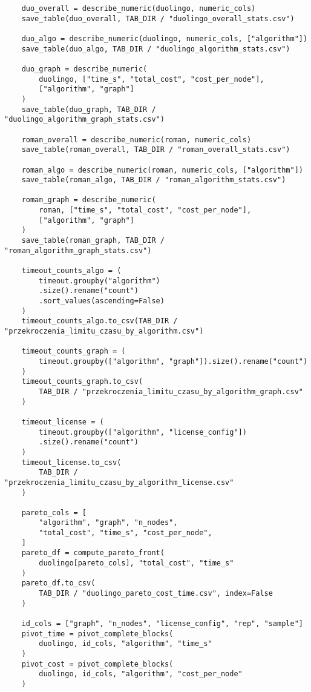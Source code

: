 \begin{verbatim}
    duo_overall = describe_numeric(duolingo, numeric_cols)
    save_table(duo_overall, TAB_DIR / "duolingo_overall_stats.csv")

    duo_algo = describe_numeric(duolingo, numeric_cols, ["algorithm"])
    save_table(duo_algo, TAB_DIR / "duolingo_algorithm_stats.csv")

    duo_graph = describe_numeric(
        duolingo, ["time_s", "total_cost", "cost_per_node"],
        ["algorithm", "graph"]
    )
    save_table(duo_graph, TAB_DIR / "duolingo_algorithm_graph_stats.csv")

    roman_overall = describe_numeric(roman, numeric_cols)
    save_table(roman_overall, TAB_DIR / "roman_overall_stats.csv")

    roman_algo = describe_numeric(roman, numeric_cols, ["algorithm"])
    save_table(roman_algo, TAB_DIR / "roman_algorithm_stats.csv")

    roman_graph = describe_numeric(
        roman, ["time_s", "total_cost", "cost_per_node"],
        ["algorithm", "graph"]
    )
    save_table(roman_graph, TAB_DIR / "roman_algorithm_graph_stats.csv")

    timeout_counts_algo = (
        timeout.groupby("algorithm")
        .size().rename("count")
        .sort_values(ascending=False)
    )
    timeout_counts_algo.to_csv(TAB_DIR / "przekroczenia_limitu_czasu_by_algorithm.csv")

    timeout_counts_graph = (
        timeout.groupby(["algorithm", "graph"]).size().rename("count")
    )
    timeout_counts_graph.to_csv(
        TAB_DIR / "przekroczenia_limitu_czasu_by_algorithm_graph.csv"
    )

    timeout_license = (
        timeout.groupby(["algorithm", "license_config"])
        .size().rename("count")
    )
    timeout_license.to_csv(
        TAB_DIR / "przekroczenia_limitu_czasu_by_algorithm_license.csv"
    )

    pareto_cols = [
        "algorithm", "graph", "n_nodes",
        "total_cost", "time_s", "cost_per_node",
    ]
    pareto_df = compute_pareto_front(
        duolingo[pareto_cols], "total_cost", "time_s"
    )
    pareto_df.to_csv(
        TAB_DIR / "duolingo_pareto_cost_time.csv", index=False
    )

    id_cols = ["graph", "n_nodes", "license_config", "rep", "sample"]
    pivot_time = pivot_complete_blocks(
        duolingo, id_cols, "algorithm", "time_s"
    )
    pivot_cost = pivot_complete_blocks(
        duolingo, id_cols, "algorithm", "cost_per_node"
    )


\end{verbatim}
